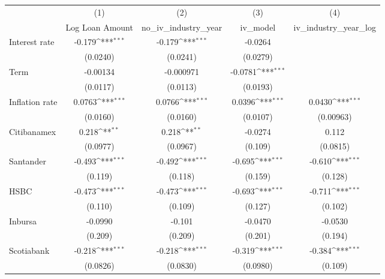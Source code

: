 {
\def\sym#1{\ifmmode^{#1}\else\(^{#1}\)\fi}
\begin{tabular}{l*{4}{c}}
\hline\hline
                &\multicolumn{1}{c}{(1)}&\multicolumn{1}{c}{(2)}&\multicolumn{1}{c}{(3)}&\multicolumn{1}{c}{(4)}\\
                &\multicolumn{1}{c}{Log Loan Amount}&\multicolumn{1}{c}{no_iv_industry_year}&\multicolumn{1}{c}{iv_model}&\multicolumn{1}{c}{iv_industry_year_log}\\
\hline
Interest rate   &   -0.179\sym{***}&   -0.179\sym{***}&  -0.0264         &                  \\
                & (0.0240)         & (0.0241)         & (0.0279)         &                  \\
Term            & -0.00134         &-0.000971         &  -0.0781\sym{***}&                  \\
                & (0.0117)         & (0.0113)         & (0.0193)         &                  \\
Inflation rate  &   0.0763\sym{***}&   0.0766\sym{***}&   0.0396\sym{***}&   0.0430\sym{***}\\
                & (0.0160)         & (0.0160)         & (0.0107)         &(0.00963)         \\
Citibanamex     &    0.218\sym{**} &    0.218\sym{**} &  -0.0274         &    0.112         \\
                & (0.0977)         & (0.0967)         &  (0.109)         & (0.0815)         \\
Santander       &   -0.493\sym{***}&   -0.492\sym{***}&   -0.695\sym{***}&   -0.610\sym{***}\\
                &  (0.119)         &  (0.118)         &  (0.159)         &  (0.128)         \\
HSBC            &   -0.473\sym{***}&   -0.473\sym{***}&   -0.693\sym{***}&   -0.711\sym{***}\\
                &  (0.110)         &  (0.109)         &  (0.127)         &  (0.102)         \\
Inbursa         &  -0.0990         &   -0.101         &  -0.0470         &  -0.0530         \\
                &  (0.209)         &  (0.209)         &  (0.201)         &  (0.194)         \\
Scotiabank      &   -0.218\sym{***}&   -0.218\sym{***}&   -0.319\sym{***}&   -0.384\sym{***}\\
                & (0.0826)         & (0.0830)         & (0.0980)         &  (0.109)         \\

\end{tabular}}

